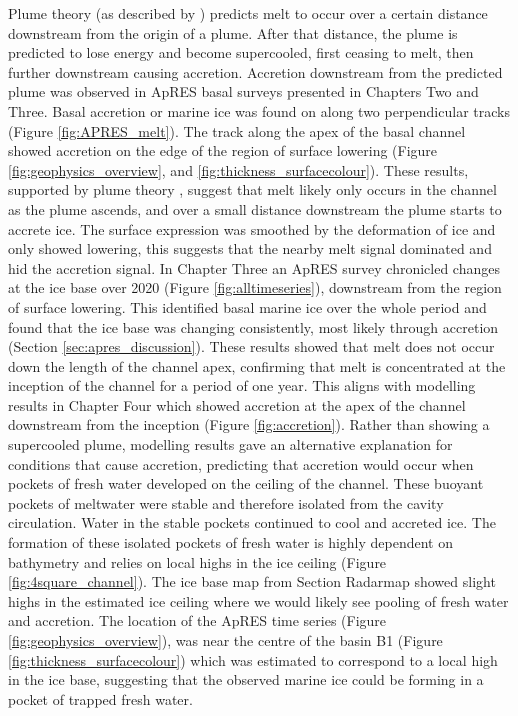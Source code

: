 Plume theory (as described by \cite{jenkins2011convection}) predicts melt to occur over a certain distance downstream from the origin of a plume. After that distance, the plume is predicted to lose energy and become supercooled, first ceasing to melt, then further downstream causing accretion.
Accretion downstream from the predicted plume was observed in ApRES basal surveys presented in Chapters Two and Three. Basal accretion or marine ice was found on along two perpendicular tracks (Figure \ref{fig:APRES_melt}). The track along the apex of the basal channel showed  accretion on the edge of the region of surface lowering (Figure \ref{fig:geophysics_overview}, and \ref{fig:thickness_surfacecolour}). These results, supported by plume theory \citep{jenkins1991one}, suggest that melt likely only occurs in the channel as the plume ascends, and over a small distance downstream the plume starts to accrete ice. The surface expression was smoothed by the deformation of ice and only showed lowering, this suggests that the nearby melt signal dominated and hid the accretion signal.
In Chapter Three an ApRES survey chronicled changes at the ice base over 2020 (Figure \ref{fig:alltimeseries}), downstream from the region of surface lowering. This identified basal marine ice over the whole period and found that the ice base was changing consistently, most likely through accretion (Section \ref{sec:apres_discussion}). These results showed that melt does not occur down the length of the channel apex, confirming that melt is concentrated at the inception of the channel for a period of one year.
This aligns with modelling results in Chapter Four which showed accretion at the apex of the channel downstream from the inception (Figure \ref{fig:accretion}).  Rather than showing a supercooled plume, modelling results gave an alternative explanation for conditions that cause accretion, predicting that accretion would occur when pockets of fresh water developed on the ceiling of the channel. These buoyant pockets of meltwater were stable and therefore isolated from the cavity circulation. Water in the stable pockets continued to cool and accreted ice. The formation of these isolated pockets of fresh water is highly dependent on bathymetry and relies on local highs in the ice ceiling (Figure \ref{fig:4square_channel}). 
The ice base map from Section Radarmap showed slight highs in the estimated ice ceiling where we would likely see pooling of fresh water and accretion. The location of the ApRES time series (Figure \ref{fig:geophysics_overview}), was near the centre of the basin B1 (Figure \ref{fig:thickness_surfacecolour}) which was estimated to correspond to a local high in the ice base, suggesting that the observed marine ice could be forming in a pocket of trapped fresh water.



